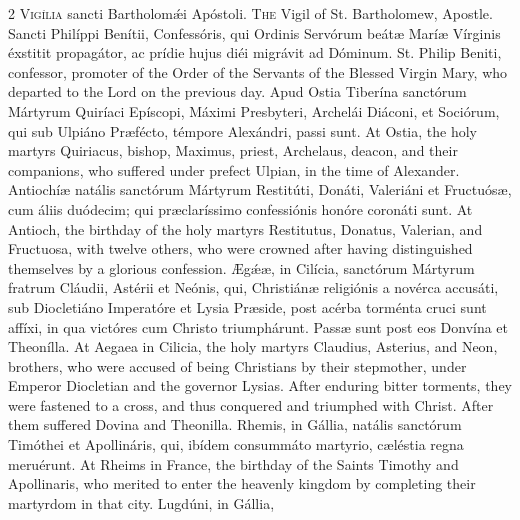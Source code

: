 \begin{paracol}{2}
\lettrine[lines=1]{V}{igília} sancti Bartholomǽi Apóstoli.
\switchcolumn
{}
\lettrine[lines=1]{T}{he} Vigil of St. Bartholomew, Apostle.
\switchcolumn*
{}
Sancti Philíppi Benítii, 
 Confessóris, qui Ordinis Servórum beátæ Maríæ Vírginis éxstitit propagátor, 
 ac prídie hujus diéi migrávit ad Dóminum.
\switchcolumn
{}
St. Philip Beniti, confessor, 
 promoter of the Order of the Servants of the Blessed Virgin Mary, who 
 departed to the Lord on the previous day.
\switchcolumn*
{}
Apud Ostia Tiberína 
 sanctórum Mártyrum Quiríaci Epíscopi, Máximi Presbyteri, Archelái Diáconi, 
 et Sociórum, qui sub Ulpiáno Præfécto, témpore Alexándri, passi sunt.
\switchcolumn
{}
At Ostia, the holy martyrs Quiriacus, 
 bishop, Maximus, priest, Archelaus, deacon, and their companions, who 
 suffered under prefect Ulpian, in the time of Alexander.
\switchcolumn*
{}
Antiochíæ natális 
 sanctórum Mártyrum Restitúti, Donáti, Valeriáni et Fructuósæ, cum áliis 
 duódecim; qui præclaríssimo confessiónis honóre coronáti sunt.
\switchcolumn
{}
At Antioch, the birthday of the holy 
 martyrs Restitutus, Donatus, Valerian, and Fructuosa, with twelve others, 
 who were crowned after having distinguished themselves by a glorious 
 confession.
\switchcolumn*
{}
Ægǽæ, in Cilícia, sanctórum Mártyrum fratrum Cláudii, Astérii et Neónis, qui, Christiánæ 
 religiónis a novérca accusáti, sub Diocletiáno Imperatóre et Lysia Præside, 
 post acérba torménta cruci sunt affíxi, in qua victóres cum Christo 
 triumphárunt. Passæ sunt post eos Donvína et Theonílla.
\switchcolumn
{}
At Aegaea in Cilicia, the holy 
 martyrs Claudius, Asterius, and Neon, brothers, who were accused of being 
 Christians by their stepmother, under Emperor Diocletian and the governor 
 Lysias. After enduring bitter torments, they were fastened to a cross, 
 and thus conquered and triumphed with Christ. After them suffered 
 Dovina and Theonilla.
\switchcolumn*
{}
Rhemis, in Gállia, 
 natális sanctórum Timóthei et Apollináris, qui, ibídem consummáto martyrio, 
 cæléstia regna meruérunt.
\switchcolumn
{}
At Rheims in France, the birthday of 
 the Saints Timothy and Apollinaris, who merited to enter the heavenly 
 kingdom by completing their martyrdom in that city.
\switchcolumn*
{}
Lugdúni, in Gállia, 

\end{paracol}
